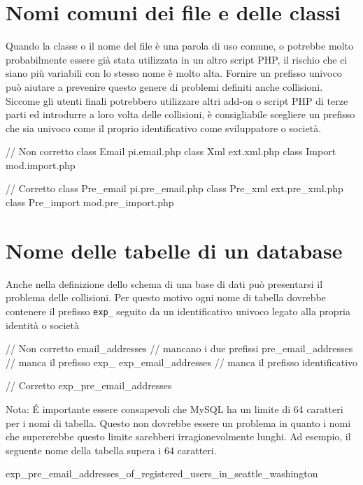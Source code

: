\section*{Nomi comuni dei file e delle classi}
Quando la classe o il nome del file è una parola di uso comune, o potrebbe molto probabilmente essere già stata utilizzata in un altro script \ac{PHP}, il rischio che ci siano più variabili con lo stesso nome è molto alta. Fornire un prefisso univoco può aiutare a prevenire questo genere di problemi definiti anche collisioni. Siccome gli utenti finali potrebbero utilizzare altri add-on o script \ac{PHP} di terze parti ed introdurre a loro volta delle collisioni, è consigliabile scegliere un prefisso che sia univoco come il proprio identificativo come sviluppatore o società.

\begin{code}
// Non corretto
class Email		pi.email.php
class Xml		ext.xml.php
class Import		mod.import.php

// Corretto
class Pre_email		pi.pre_email.php
class Pre_xml		ext.pre_xml.php
class Pre_import	mod.pre_import.php
\end{code}

\section*{Nome delle tabelle di un database}
Anche nella definizione dello schema di una base di dati può presentarsi il problema delle collisioni. Per questo motivo ogni nome di tabella dovrebbe contenere il prefisso \verb|exp_| seguito da un identificativo univoco legato alla propria identità o società

\begin{code}
// Non corretto
email_addresses		// mancano i due prefissi
pre_email_addresses	// manca il prefisso exp_
exp_email_addresses	// manca il prefisso identificativo

// Corretto
exp_pre_email_addresses
\end{code}

Nota: \'E importante essere consapevoli che MySQL ha un limite di 64 caratteri per i nomi di tabella. Questo non dovrebbe essere un problema in quanto i nomi che supererebbe questo limite sarebberi irragionevolmente lunghi. Ad esempio, il seguente nome della tabella supera i 64 caratteri. 

\begin{code}
exp_pre_email_addresses_of_registered_users_in_seattle_washington
\end{code}

